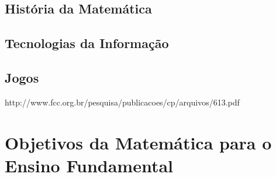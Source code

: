 


\nocite{stancanelli2001conhecendo}





\subsection{História da Matemática}

\nocite{roque2012historia}

\subsection{Tecnologias da Informação}

\subsection{Jogos}
http://www.fcc.org.br/pesquisa/publicacoes/cp/arquivos/613.pdf

\section{Objetivos da Matemática para o Ensino Fundamental}

